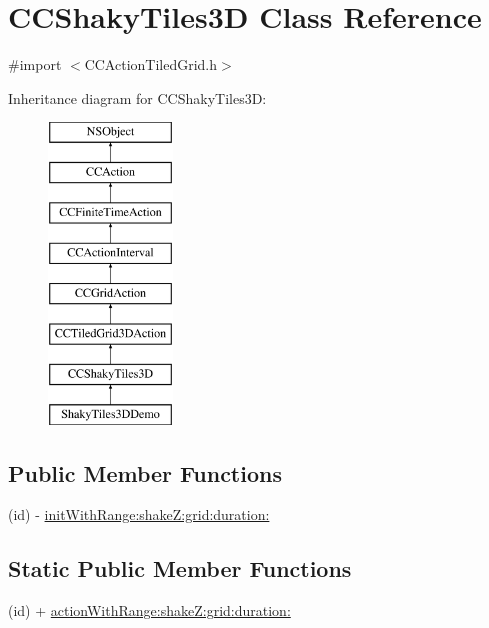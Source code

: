 \hypertarget{interface_c_c_shaky_tiles3_d}{\section{C\-C\-Shaky\-Tiles3\-D Class Reference}
\label{interface_c_c_shaky_tiles3_d}
}


{\ttfamily \#import $<$C\-C\-Action\-Tiled\-Grid.\-h$>$}

Inheritance diagram for C\-C\-Shaky\-Tiles3\-D\-:\begin{figure}[H]
\begin{center}
\leavevmode
\includegraphics[height=8.000000cm]{interface_c_c_shaky_tiles3_d}
\end{center}
\end{figure}
\subsection*{Public Member Functions}
\begin{DoxyCompactItemize}
\item 
(id) -\/ \hyperlink{interface_c_c_shaky_tiles3_d_aebd5423f44f75e6a177c8135ceb9cb0d}{init\-With\-Range\-:shake\-Z\-:grid\-:duration\-:}
\end{DoxyCompactItemize}
\subsection*{Static Public Member Functions}
\begin{DoxyCompactItemize}
\item 
(id) + \hyperlink{interface_c_c_shaky_tiles3_d_a5c49d0a0f999157f418c2484889aa00e}{action\-With\-Range\-:shake\-Z\-:grid\-:duration\-:}
\end{DoxyCompactItemize}

